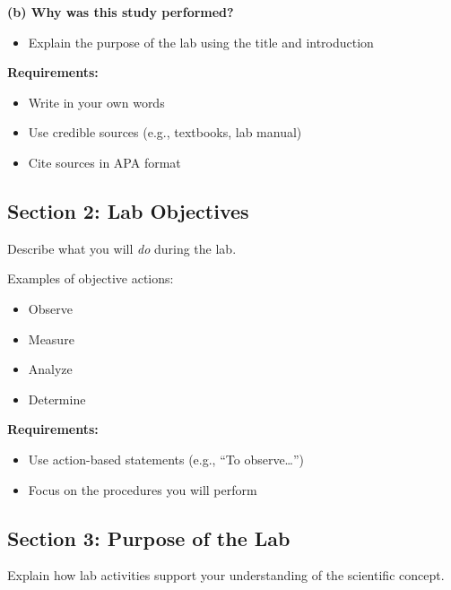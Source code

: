\documentclass[
  letterpaper,
  DIV=11,
  numbers=noendperiod]{scrreprt}
\providecommand{\tightlist}{%
  \setlength{\itemsep}{0pt}\setlength{\parskip}{0pt}}
\begin{document}
\textbf{(b) Why was this study performed?}

\begin{itemize}
\tightlist
\item
  Explain the purpose of the lab using the title and introduction
\end{itemize}

\textbf{Requirements:}

\begin{itemize}
\item
  Write in your own words
\item
  Use credible sources (e.g., textbooks, lab manual)
\item
  Cite sources in APA format
\end{itemize}

\subsection*{\texorpdfstring{\textbf{Section 2: Lab
Objectives}}{Section 2: Lab Objectives}}\label{section-2-lab-objectives}

Describe what you will \emph{do} during the lab.

Examples of objective actions:

\begin{itemize}
\item
  Observe
\item
  Measure
\item
  Analyze
\item
  Determine
\end{itemize}

\textbf{Requirements:}

\begin{itemize}
\item
  Use action-based statements (e.g., ``To observe\ldots{}'')
\item
  Focus on the procedures you will perform
\end{itemize}

\subsection*{\texorpdfstring{\textbf{Section 3: Purpose of the
Lab}}{Section 3: Purpose of the Lab}}\label{section-3-purpose-of-the-lab}

Explain how lab activities support your understanding of the scientific
concept.
\end{document}
